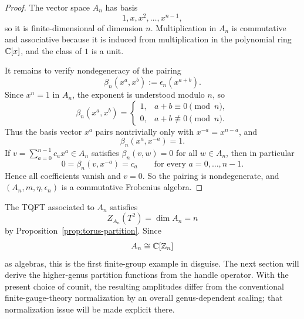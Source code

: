\begin{proof}
The vector space $A_n$ has basis
\begin{equation}\label{eq:An-basis}
1,x,x^2,\ldots,x^{n-1},
\end{equation}
so it is finite-dimensional of dimension $n$. Multiplication in $A_n$ is commutative and associative because it is induced from multiplication in the polynomial ring $\mathbb{C}[x]$, and the class of $1$ is a unit.

\medskip

\noindent It remains to verify nondegeneracy of the pairing
\begin{equation}\label{eq:An-pairing}
\beta_n(x^a,x^b) := \epsilon_n(x^{a+b}).
\end{equation}
Since $x^n=1$ in $A_n$, the exponent is understood modulo $n$, so
\begin{equation}\label{eq:An-pairing-explicit}
\beta_n(x^a,x^b) =
\begin{cases}
1, & a+b \equiv 0 \pmod n,\\
0, & a+b \not\equiv 0 \pmod n.
\end{cases}
\end{equation}
Thus the basis vector $x^a$ pairs nontrivially only with $x^{-a}=x^{n-a}$, and
\begin{equation}\label{eq:An-dual-basis}
\beta_n(x^a,x^{-a}) = 1.
\end{equation}
If $v=\sum_{a=0}^{n-1} c_a x^a \in A_n$ satisfies $\beta_n(v,w)=0$ for all $w \in A_n$, then in particular
\begin{equation*}
0=\beta_n(v,x^{-a}) = c_a
\qquad
\text{for every } a=0,\dots,n-1.
\end{equation*}
Hence all coefficients vanish and $v=0$. So the pairing is nondegenerate, and $(A_n,m,\eta,\epsilon_n)$ is a commutative Frobenius algebra.
\end{proof}

\begin{remark}\label{rem:An-torus}
The TQFT associated to $A_n$ satisfies
\begin{equation}\label{eq:An-torus}
Z_{A_n}(T^2)=\dim A_n=n
\end{equation}
by Proposition~\ref{prop:torus-partition}. Since
\begin{equation}\label{eq:An-group-algebra}
A_n \cong \mathbb{C}[\mathbb{Z}_n]
\end{equation}
as algebras, this is the first finite-group example in disguise. The next section will derive the higher-genus partition functions from the handle operator. With the present choice of counit, the resulting amplitudes differ from the conventional finite-gauge-theory normalization by an overall genus-dependent scaling; that normalization issue will be made explicit there.
\end{remark}

